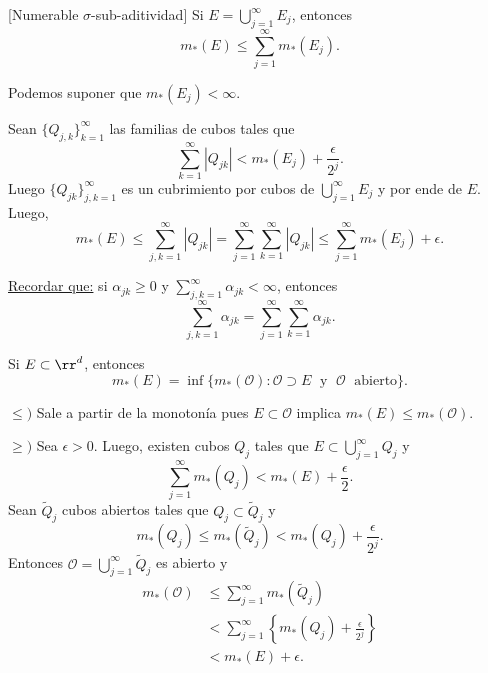     \begin{observacion}{}[Numerable $\sigma$-sub-aditividad]\label{obs:sigma-subaditividad}
    Si $E=\bigcup\limits_{j=1}^{\infty} E_j$, entonces 
    \[m_{*}(E)\leq \sum\limits_{j=1}^{\infty} m_{*}(E_j).\]
    \begin{demo}
    Podemos suponer que $m_{*}(E_j)<\infty$.
    
    Sean  $\{Q_{j,k}\}_{k=1}^{\infty}$ las familias de cubos tales que 
    \[
    \sum\limits_{k=1}^{\infty} |Q_{jk}|<m_{*}(E_j)+\frac{\epsilon}{2^j}.
    \]
    Luego $\{Q_{jk}\}_{j, k=1}^{\infty}$ es un cubrimiento por cubos de $\bigcup\limits_{j=1}^{\infty} E_j$
    y por ende de $E$. 
    Luego, 
    \[
    m_{*}(E)\leq \sum\limits_{j,k=1}^{\infty} |Q_{jk}|=
    \sum\limits_{j=1}^{\infty} \sum\limits_{k=1}^{\infty} |Q_{jk}|
    \leq \sum\limits_{j=1}^{\infty} m_{*}(E_j)+\epsilon.
    \]
       \end{demo}
        \underline{Recordar que:} si $\alpha_{jk}\geq 0$ y $\sum\limits_{j,k=1}^{\infty} \alpha_{jk}<\infty$, entonces
    \[
    \sum\limits_{j,k=1}^{\infty} \alpha_{jk}=
    \sum\limits_{j=1}^{\infty} \sum\limits_{k=1}^{\infty}\alpha_{jk}.
    \]
    \end{observacion}
    
    \begin{observacion}{}\label{obs:def-medida-ext-abierto}
    Si $E\subset \rr^d$, entonces
    \[
    m_{*}(E)=
    \inf\{
    m_{*}(\mathcal{O}): \mathcal{O}\supset E\;\mbox{ y }\;\mathcal{O}\;\mbox{ abierto} 
    \}.
    \]
    
    \begin{demo}
    $\leq)$
    Sale a partir de la monoton\'ia pues $E \subset \mathscr{O}$ implica $m_{*}(E)\leq m_{*}(\mathscr{O})$.
    
    $\geq)$
    Sea $\epsilon>0$. Luego, existen cubos  $Q_j$  tales que $E\subset \bigcup\limits_{j=1}^{\infty}Q_j$ y 
    \[
    \sum\limits_{j=1}^{\infty} m_{*}(Q_j)< m_{*}(E)+\frac{\epsilon}{2}.
    \]
    Sean $\widetilde{Q}_j$ cubos abiertos tales que $Q_j \subset \widetilde{Q}_j$ y 
    \[
    m_{*}(Q_j)\leq m_{*}(\widetilde{Q}_j)<m_{*}(Q_j)+\frac{\epsilon}{2^j}.
    \]
    Entonces 
    $\mathcal{O}=\bigcup\limits_{j=1}^{\infty} \widetilde{Q}_j$         es abierto y 
        \[
        \begin{split}
        m_{*}(\mathscr{O})
        &\leq \sum\limits_{j=1}^{\infty}m_{*}(\widetilde{Q}_j)
        \\
        &<  \sum\limits_{j=1}^{\infty} \left\{m_{*}(Q_j)+\frac{\epsilon}{2^j}\right\}
        \\
        &<m_{*}(E)+\epsilon.
        \end{split}
        \]
    \end{demo}
    \end{observacion}
    
